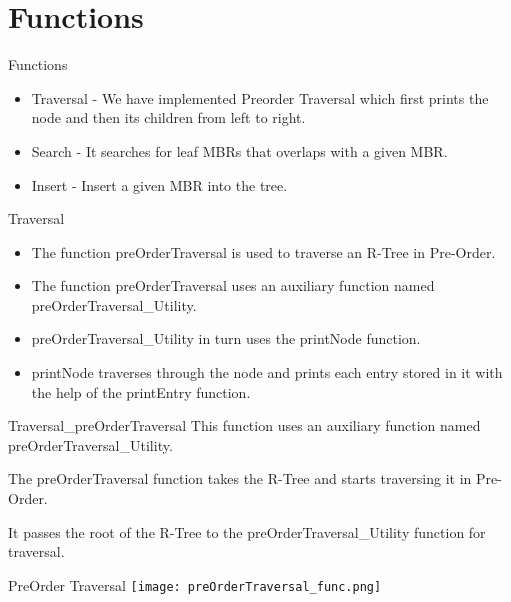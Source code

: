 \documentclass{beamer}
\begin{document}
\section{Functions}
\begin{frame}{Functions}
\begin{itemize}
    \item Traversal - We have implemented Preorder Traversal which first prints the node and then its children from left to right.
    \bigskip
    \item Search - It searches for leaf MBRs that overlaps with a given MBR.
    \bigskip
    \item Insert - Insert a given MBR into the tree.
    \bigskip
\end{itemize}
\end{frame}
\begin{frame}{Traversal}
    \begin{itemize}
        \item The function preOrderTraversal is used to traverse an R-Tree in Pre-Order.
    
        \bigskip
        \item The function preOrderTraversal uses an auxiliary function named preOrderTraversal\_Utility.
        
        \bigskip 
        \item preOrderTraversal\_Utility in turn uses the printNode function.
        
        \bigskip
        \item printNode traverses through the node and prints each entry stored in it with the help of the printEntry function.
    \end{itemize}
\end{frame}
\begin{frame}{Traversal_{preOrderTraversal}}
    This function uses an auxiliary function named preOrderTraversal\_Utility.
    
    The preOrderTraversal function takes the R-Tree and starts traversing it in Pre-Order.
    
    It passes the root of the R-Tree to the preOrderTraversal\_Utility function for traversal.
    
    \begin{block}{PreOrder Traversal}
        \texttt{[image: preOrderTraversal\_func.png]}
    \end{block}
\end{frame}
\end{document}
